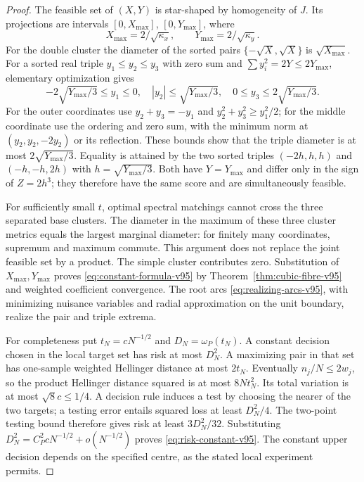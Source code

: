 \begin{proof}
The feasible set of $(X,Y)$ is star-shaped by homogeneity of $J$.
Its projections are intervals $[0,X_{\max}]$, $[0,Y_{\max}]$, where
\[
 X_{\max}=2/\sqrt{\kappa_x},\qquad
 Y_{\max}=2/\sqrt{\kappa_y}.
\]
For the double cluster the diameter of the sorted pairs
$\{-\sqrt X,\sqrt X\}$ is $\sqrt{X_{\max}}$.
For a sorted real triple $y_1\le y_2\le y_3$ with zero sum and
$\sum y_i^2=2Y\le2Y_{\max}$, elementary optimization gives
\[
 -2\sqrt{Y_{\max}/3}\le y_1\le0,\quad
 |y_2|\le\sqrt{Y_{\max}/3},\quad
 0\le y_3\le2\sqrt{Y_{\max}/3}.
\]
For the outer coordinates use $y_2+y_3=-y_1$ and
$y_2^2+y_3^2\ge y_1^2/2$; for the middle coordinate use the ordering
and zero sum, with the minimum norm at $(y_2,y_2,-2y_2)$ or its
reflection. These bounds show that the triple diameter is at most
$2\sqrt{Y_{\max}/3}$. Equality is attained by the two sorted triples
$(-2h,h,h)$ and $(-h,-h,2h)$ with $h=\sqrt{Y_{\max}/3}$.
Both have $Y=Y_{\max}$ and differ only in the sign of $Z=2h^3$;
they therefore have the same score and are simultaneously feasible.

For sufficiently small $t$, optimal spectral matchings cannot cross
the three separated base clusters. The diameter in the maximum of
these three cluster metrics equals the largest marginal diameter:
for finitely many coordinates, supremum and maximum commute. This
argument does not replace the joint feasible set by a product. The
simple cluster contributes zero. Substitution of $X_{\max},Y_{\max}$
proves \eqref{eq:constant-formula-v95} by
Theorem~\ref{thm:cubic-fibre-v95} and weighted coefficient convergence.
The root arcs \eqref{eq:realizing-arcs-v95}, with minimizing nuisance
variables and radial approximation on the unit boundary, realize the
pair and triple extrema.

For completeness put $t_N=cN^{-1/2}$ and $D_N=\omega_P(t_N)$.
A constant decision chosen in the local target set has risk at most
$D_N^2$. A maximizing pair in that set has one-sample weighted
Hellinger distance at most $2t_N$. Eventually $n_j/N\le2w_j$, so
the product Hellinger distance squared is at most $8Nt_N^2$.
Its total variation is at most $\sqrt8c\le1/4$. A decision rule
induces a test by choosing the nearer of the two targets; a testing
error entails squared loss at least $D_N^2/4$. The two-point testing
bound therefore gives risk at least $3D_N^2/32$. Substituting
$D_N^2=C_P^2cN^{-1/2}+o(N^{-1/2})$ proves
\eqref{eq:risk-constant-v95}. The constant upper decision depends on
the specified centre, as the stated local experiment permits.
\end{proof}

